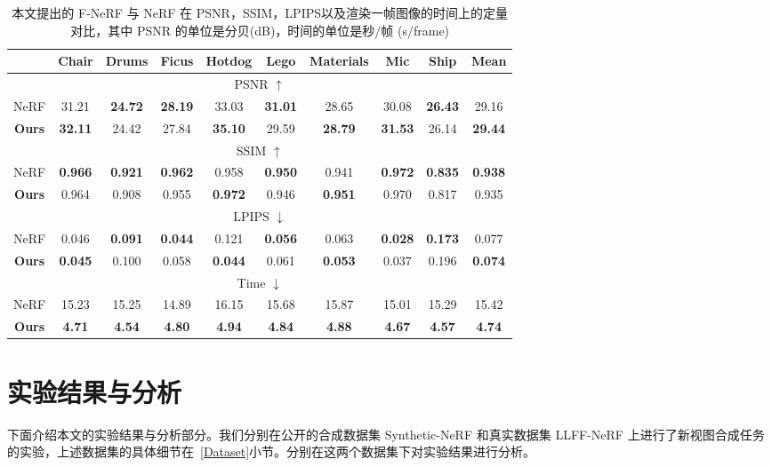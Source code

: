 \begin{table}[t]
	\caption{本文提出的 F-NeRF 与 NeRF 在 PSNR，SSIM，LPIPS以及渲染一帧图像的时间上的定量对比，其中 PSNR 的单位是分贝(\si{dB})，时间的单位是秒/帧 (s/frame)}
	\label{tab:synthetic}
	\centering
	{\small{}\setlength\tabcolsep{6pt}
		\begin{tabular}{cccccccccc}
			\toprule
					
			& Chair & Drums  & Ficus  & Hotdog &  Lego  & Materials & Mic & Ship & Mean\\
			\hline
			\multicolumn{10}{c}{PSNR $ \uparrow$} \\
			\hline
			NeRF   & 31.21	&\textbf{24.72}	&\textbf{28.19}	&33.03	&\textbf{31.01}	&28.65	&30.08	&\textbf{26.43}	&29.16\\
			\textbf{Ours} & \textbf{32.11}	&24.42	&27.84	&\textbf{35.10}	&29.59	&\textbf{28.79}	&\textbf{31.53}	&26.14	&\textbf{29.44}\\
			\hline
			\multicolumn{10}{c}{SSIM $ \uparrow$} \\
			\hline
			NeRF   &\textbf{0.966}	&\textbf{0.921}	&\textbf{0.962}	&0.958	&\textbf{0.950}	&0.941	&\textbf{0.972}	&\textbf{0.835}	&\textbf{0.938}\\
			\textbf{Ours} & 0.964	&0.908	&0.955	&\textbf{0.972}	&0.946	&\textbf{0.951}	&0.970	&0.817	&0.935\\
			\hline
			\multicolumn{10}{c}{LPIPS $ \downarrow$}\\
			\hline
			NeRF   & 0.046	&\textbf{0.091}	&\textbf{0.044}	&0.121	&\textbf{0.056}	&0.063	&\textbf{0.028}	&\textbf{0.173}	&0.077\\
			\textbf{Ours} & \textbf{0.045}	&0.100	&0.058	&\textbf{0.044}	&0.061	&\textbf{0.053}	&0.037	&0.196	&\textbf{0.074}\\
			\hline
			\multicolumn{10}{c}{Time $ \downarrow$}\\
			\hline
			NeRF   & 15.23	&15.25	&14.89	&16.15	&15.68	&15.87	&15.01	&15.29	&15.42\\
			\textbf{Ours} & \textbf{4.71}	&\textbf{4.54}	&\textbf{4.80}	&\textbf{4.94}	&\textbf{4.84}	&\textbf{4.88}	&\textbf{4.67}	&\textbf{4.57}	&\textbf{4.74}\\
			\bottomrule
		\end{tabular}
	}
\end{table}

\newpage

\section{实验结果与分析}\label{results}
下面介绍本文的实验结果与分析部分。我们分别在公开的合成数据集 Synthetic-NeRF 和真实数据集 LLFF-NeRF 上进行了新视图合成任务的实验，上述数据集的具体细节在~\ref{Dataset}小节。分别在这两个数据集下对实验结果进行分析。
